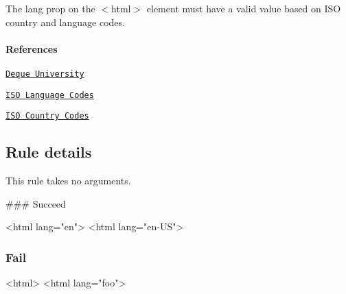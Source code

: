 The {\ttfamily lang} prop on the {\ttfamily $<$html$>$} element must have a valid value based on I\+SO country and language codes.

\paragraph*{References}


\begin{DoxyEnumerate}
\item \href{https://dequeuniversity.com/rules/axe/1.1/valid-lang}{\tt Deque University}
\item \href{http://www.w3schools.com/tags/ref_language_codes.asp}{\tt I\+SO Language Codes}
\item \href{http://www.w3schools.com/tags/ref_country_codes.asp}{\tt I\+SO Country Codes}
\end{DoxyEnumerate}

\subsection*{Rule details}

This rule takes no arguments.

\#\#\# Succeed 
\begin{DoxyCode}
<html lang="en">
<html lang="en-US">
\end{DoxyCode}


\subsubsection*{Fail}


\begin{DoxyCode}
<html>
<html lang="foo">
\end{DoxyCode}
 